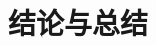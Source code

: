 \documentclass[a4paper]{article}
\begin{document}

\newpage


\newpage


\newpage


\newpage


\newpage


\newpage

\section{结论与总结}
\end{document}
